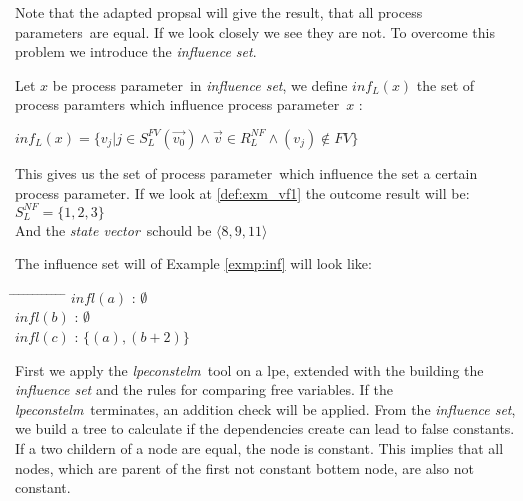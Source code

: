 \documentclass[a4paper,10pt]{article}
\theoremstyle{plain}
\theoremstyle{definition}
\newcommand{\tool}{\textit{lpeconstelm}}
\newcommand{\ovr}{\overrightarrow}
\newcommand{\pp}{process parameter}
\newcommand{\pps}{process parameters}
\newcommand{\ti}{\textit}
\newcommand{\sv}{\textit{state vector}}
\newcommand{\ifs}{\ti{influence set}}
\newcommand{\tab}{\hspace*{5.mm} \= \hspace*{5.mm} \= \hspace*{5.mm} \= \hspace*{5.mm} \= \hspace*{5.mm} \= \hspace*{5.mm}  \= \hspace*{5.mm}  \= \hspace*{5.mm}  \= \hspace*{5.mm} \= \hspace*{5.mm} \= \hspace*{5.mm}  \= \hspace*{5.mm}  \= \hspace*{5.mm}\kill}
\begin{document}
Note that the adapted propsal will give the result, that all \pps\ are equal. If we look closely we see they are not.
To overcome this problem we introduce the \ifs . 

Let $x$ be \pp\ in \ifs , we define $inf_L(x)$ the set of process paramters which influence \pp\ $x$ :\\

\begin{def}\label{def:comp_fv}
$ inf_L(x) = \lbrace v_j \vert j \in S_L^{FV}(\ovr{v_0}) \wedge \ovr{v} \in R_L^{NF} \wedge (v_j) \not\in FV \rbrace $ 
\end{def}

\begin{example}\label{exmp:inf}

This gives us the set of \pp\ which influence the set a certain \pp . If we look at \ref{def:exm_vf1} the outcome result will be:\\

$S_L^{NF} = \lbrace 1, 2, 3\rbrace$ \\

And the \sv\ schould be $\langle 8, 9, 11\rangle$

The influence set will of Example \ref{exmp:inf} will look like:
\begin{tabbing}
\tab
\> $infl(a)$ \> \> : \> $ \emptyset $\\
\> $infl(b)$ \> \> : \> $ \emptyset $\\
\> $infl(c)$ \> \> : \> $\lbrace (a), (b+2) \rbrace$\\
\end{tabbing}
\end{example}

First we apply the \tool\ tool on a lpe, extended with the building the \ti{influence set} and the rules for comparing free variables. If the \tool\ terminates, an addition check will be applied. From the \ifs , we build a tree to calculate if the  dependencies create can lead to false constants. If a two childern of a node are equal, the node is constant. This implies that all nodes, which are parent of the first not constant bottem node, are also not constant.  

\newpage
\end{document}
